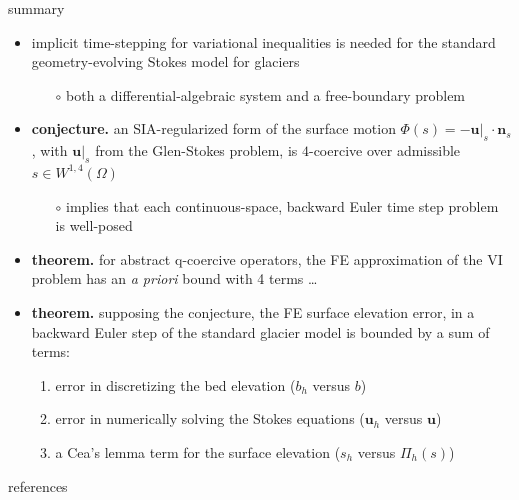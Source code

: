\documentclass[10pt,svgnames]{beamer}
\newcommand{\bn}{\mathbf{n}}
\newcommand{\bu}{\mathbf{u}}
\newcommand{\qq}{\mathrm{q}}
\begin{document}
\begin{frame}{summary}
\begin{itemize}
\item implicit time-stepping for variational inequalities is needed for the standard geometry-evolving Stokes model for glaciers
    \begin{itemize}
    \item[$\circ$] both a differential-algebraic system and a free-boundary problem
    \end{itemize}
\item<2-4> \textbf{conjecture.} an SIA-regularized form of the surface motion $\Phi(s) = -\bu|_s\cdot \bn_s$, with $\bu|_s$ from the Glen-Stokes problem, is $4$-coercive over admissible $s\in W^{1,4}(\Omega)$
    \begin{itemize}
    \item[$\circ$] implies that each continuous-space, backward Euler time step problem is well-posed
    \end{itemize}
\item<3-4> \textbf{theorem.} for abstract $\qq$-coercive operators, the FE approximation of the VI problem has an \emph{a priori} bound with 4 terms \dots
\item<4> \textbf{theorem.} supposing the conjecture, the FE surface elevation error, in a backward Euler step of the standard glacier model is bounded by a sum of terms:
    \begin{enumerate}
    \item error in discretizing the bed elevation ($b_h$ versus $b$)
    \item error in numerically solving the Stokes equations ($\bu_h$ versus $\bu$)
    \item a Cea's lemma term for the surface elevation ($s_h$ versus $\Pi_h(s)$) \strut
    \end{enumerate}
\end{itemize}
\end{frame}


\begin{frame}{references}

{\footnotesize }
\end{frame}
\end{document}
